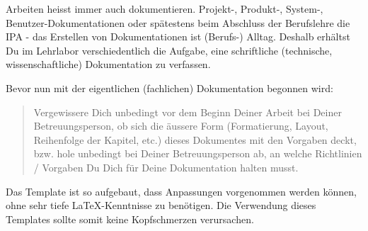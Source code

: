 Arbeiten heisst immer auch dokumentieren. Projekt-, Produkt-, System-, Benutzer-Do\-ku\-men\-ta\-ti\-on\-en oder spätestens beim Abschluss der Berufslehre die IPA - das Erstellen von Dokumentationen ist (Berufs-) Alltag. Deshalb erhältst Du im Lehrlabor verschiedentlich die Aufgabe, eine schriftliche (technische, wissenschaftliche) Dokumentation zu verfassen.

Bevor nun mit der eigentlichen (fachlichen) Dokumentation begonnen wird:

\begin{quote}
    \begin{tcolorbox} 
        Vergewissere Dich unbedingt vor dem Beginn Deiner Arbeit bei Deiner Betreuungsperson, 
        ob sich die äussere Form (Formatierung, Layout, Reihenfolge der Kapitel, etc.) dieses
        Dokumentes mit den Vorgaben deckt, bzw. hole unbedingt bei Deiner Betreuungsperson ab, 
        an welche Richtlinien / Vorgaben Du Dich für Deine Dokumentation halten musst. 
    \end{tcolorbox}
\end{quote}

Das Template ist so aufgebaut, dass Anpassungen vorgenommen werden können, ohne sehr tiefe \LaTeX -Kenntnisse zu benötigen. Die Verwendung dieses Templates sollte somit keine Kopfschmerzen verursachen.  
